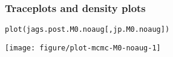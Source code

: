 \documentclass[color=usenames,dvipsnames]{beamer}\usepackage[]{graphicx}\usepackage[]{color}
\makeatletter
\newcommand{\hlstd}[1]{\textcolor[rgb]{0,0,0}{#1}}%
\newcommand{\hlkwd}[1]{\textcolor[rgb]{0.004,0.004,0.506}{#1}}%
\newenvironment{kframe}{%
 \def\at@end@of@kframe{}%
 \ifinner\ifhmode%
  \def\at@end@of@kframe{\end{minipage}}%
  \begin{minipage}{\columnwidth}%
 \fi\fi%
 \def\FrameCommand##1{\hskip\@totalleftmargin \hskip-\fboxsep
 \colorbox{shadecolor}{##1}\hskip-\fboxsep
     \hskip-\linewidth \hskip-\@totalleftmargin \hskip\columnwidth}%
 \MakeFramed {\advance\hsize-\width
   \@totalleftmargin\z@ \linewidth\hsize
   \@setminipage}}%
 {\par\unskip\endMakeFramed%
 \at@end@of@kframe}
\newenvironment{knitrout}{}{} %
\makeatother
\begin{document}
\begin{frame}[fragile]
  \frametitle{Traceplots and density plots}
\begin{knitrout}\footnotesize
{}\color{fgcolor}\begin{kframe}
\begin{alltt}
\hlkwd{plot}\hlstd{(jags.post.M0.noaug[,jp.M0.noaug])}
\end{alltt}
\end{kframe}

{\centering \texttt{[image: figure/plot-mcmc-M0-noaug-1]} 

}



\end{knitrout}
\end{frame}













\end{document}
